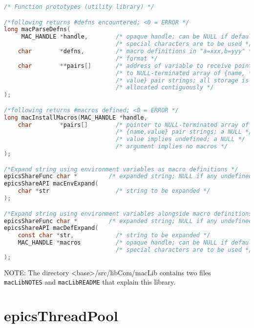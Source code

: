 \begin{lstlisting}[language=C]
/* Function prototypes (utility library) */

/*following returns #defns encountered; <0 = ERROR */
long macParseDefns(
     MAC_HANDLE *handle,        /* opaque handle; can be NULL if default */
                                /* special characters are to be used */
    char        *defns,         /* macro definitions in "a=xxx,b=yyy" */
                                /* format */
    char        **pairs[]       /* address of variable to receive pointer */
                                /* to NULL-terminated array of {name, */
                                /* value} pair strings; all storage is */
                                /* allocated contiguously */
);

/*following returns #macros defined; <0 = ERROR */
long macInstallMacros(MAC_HANDLE *handle,
    char        *pairs[]        /* pointer to NULL-terminated array of */
                                /* {name,value} pair strings; a NULL */
                                /* value implies undefined; a NULL */
                                /* argument implies no macros */
);

/*Expand string using environment variables as macro definitions */
epicsShareFunc char *         /* expanded string; NULL if any undefined macros */
epicsShareAPI macEnvExpand(
    char *str                   /* string to be expanded */
);

/*Expand string using environment variables alongside macro definitions */
epicsShareFunc char *         /* expanded string; NULL if any undefined macros */
epicsShareAPI macDefExpand(
    const char *str,            /* string to be expanded */
    MAC_HANDLE *macros          /* opaque handle; can be NULL if default */
                                /* special characters are to be used */
);
\end{lstlisting}

NOTE: The directory \textless{}base\textgreater{}/src/libCom/macLib contains two files \verb|macLibNOTES| and \verb|macLibREADME| that explain this library.

\section{epicsThreadPool}

